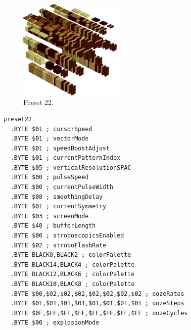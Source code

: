 \begin{minipage}[b]{0.48\linewidth}
\begin{figure}[H]                                                          
  \centering                                                             
  \begin{adjustbox}{width=5cm,center}                                   
  \includegraphics[width=5cm]{src/colorspace_presets/preset22-45.png}%
  \end{adjustbox}                                                        
\caption*{Preset 22.}                                           
\end{figure}                                                               
\end{minipage}
\hspace{0.1cm}
\begin{minipage}[b]{0.48\linewidth}                                       
\begin{lstlisting}[basicstyle=\ttfamily\tiny]
preset22
  .BYTE $01 ; cursorSpeed
  .BYTE $01 ; vectorMode
  .BYTE $01 ; speedBoostAdjust
  .BYTE $01 ; currentPatternIndex
  .BYTE $05 ; verticalResolutionSPAC
  .BYTE $00 ; pulseSpeed
  .BYTE $00 ; currentPulseWidth
  .BYTE $08 ; smoothingDelay
  .BYTE $01 ; currentSymmetry
  .BYTE $03 ; screenMode
  .BYTE $40 ; bufferLength
  .BYTE $00 ; stroboscopicsEnabled
  .BYTE $02 ; stroboFlashRate
  .BYTE BLACK0,BLACK2 ; colorPalette
  .BYTE BLACK14,BLACK4 ; colorPalette
  .BYTE BLACK12,BLACK6 ; colorPalette
  .BYTE BLACK10,BLACK8 ; colorPalette
  .BYTE $00,$02,$02,$02,$02,$02,$02,$02 ; oozeRates
  .BYTE $01,$01,$01,$01,$01,$01,$01,$01 ; oozeSteps
  .BYTE $0F,$FF,$FF,$FF,$FF,$FF,$FF,$FF ; oozeCycles
  .BYTE $00 ; explosionMode
\end{lstlisting}
\end{minipage}

